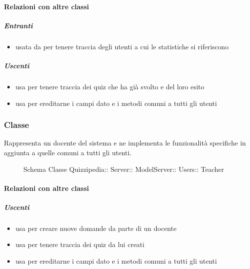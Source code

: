 \paragraph{Relazioni con altre classi}
\subparagraph{Entranti}
\begin{itemize}
\item usata da  per tenere traccia degli utenti a cui le statistiche si riferiscono
\end{itemize}
\subparagraph{Uscenti}
\begin{itemize}
\item usa  per tenere traccia dei quiz che ha già svolto e del loro esito
\item usa  per ereditarne i campi dato e i metodi comuni a tutti gli utenti
\end{itemize}
\subsubsection{Classe }
Rappresenta un docente del sistema e ne implementa le funzionalità specifiche in aggiunta a quelle comuni a tutti gli utenti.
\begin{figure}[H]
\centering
\noindent{}
\caption[Schema Classe Teacher]{Schema Classe Quizzipedia:: Server:: ModelServer:: Users:: Teacher}
\end{figure}
\paragraph{Relazioni con altre classi}
\subparagraph{Uscenti}
\begin{itemize}
\item usa  per creare nuove domande da parte di un docente
\item usa  per tenere traccia dei quiz da lui creati
\item usa  per ereditarne i campi dato e i metodi comuni a tutti gli utenti
\end{itemize}
